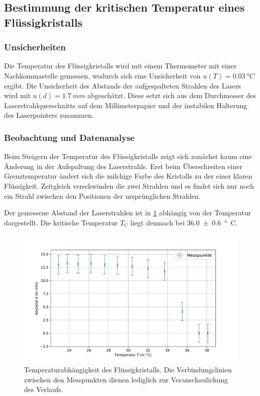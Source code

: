 \documentclass[
	a4paper,
	12pt,
	pagesize,
	ngerman
]{scrartcl}
\begin{document}
	\subsection{Bestimmung der kritischen Temperatur eines Flüssigkristalls} %
	\subsubsection{Unsicherheiten}
	Die Temperatur des Flüssigkristalls wird mit einem Thermometer mit einer Nachkommastelle gemessen, wodurch sich eine Unsicherheit von $u(T)=\SI{0.03}{\degree C}$ ergibt.
	Die Unsicherheit des Abstands der aufgespalteten Strahlen des Lasers wird mit $u(d)=\SI{1.7}{mm}$ abgeschätzt.
	Diese setzt sich aus dem Durchmesser des Laserstrahlquerschnitts auf dem Millimeterpapier und der instabilen Halterung des Laserpointers zusammen.
	\subsubsection{Beobachtung und Datenanalyse}
	Beim Steigern der Temperatur des Flüssigkristalls zeigt sich zunächst kaum eine Änderung in der Aufspaltung des Laserstrahls.
	Erst beim Überschreiten einer Grenztemperatur ändert sich die milchige Farbe des Kristalls zu der einer klaren Flüssigkeit.
	Zeitgleich verschwinden die zwei Strahlen und es findet sich nur noch ein Strahl zwischen den Positionen der ursprünglichen Strahlen.

	Der gemessene Abstand der Laserstrahlen ist in \cref{fig_laser} abhängig von der Temperatur dargestellt.
	Die kritische Temperatur $T_C$ liegt demnach bei \SI{36.0+-0.6}{\degree C}.
		\begin{figure}[H]
			\includegraphics[width=1\linewidth]{images/laser.pdf}
			\caption{
			Temperaturabhängigkeit des Flüssigkristalls.
			Die Verbindungslinien zwischen den Messpunkten dienen lediglich zur Veranschaulichung des Verlaufs. %
			}
			\label{fig_laser}
	\end{figure}
\end{document}
